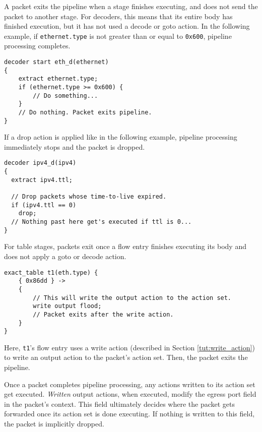 A packet exits the pipeline when
a stage finishes executing, and does not send the packet to another stage. For
decoders, this means that its entire body has finished execution, but it has not
used a decode or goto action. In the following example, if
\texttt{ethernet.type} is not greater than or equal to \texttt{0x600}, pipeline
processing completes.

\begin{codepage}
\begin{lstlisting}
decoder start eth_d(ethernet)
{
	extract ethernet.type;
	if (ethernet.type >= 0x600) {
		// Do something...
	}
	// Do nothing. Packet exits pipeline.
}
\end{lstlisting}
\end{codepage}

If a drop action is applied like in the following example, pipeline processing
immediately stops and the packet is dropped.

\begin{codepage}
\begin{lstlisting}
decoder ipv4_d(ipv4)
{
  extract ipv4.ttl;

  // Drop packets whose time-to-live expired.
  if (ipv4.ttl == 0)
  	drop;
  // Nothing past here get's executed if ttl is 0...
}
\end{lstlisting}
\end{codepage}

For table stages, packets exit once a flow entry finishes executing its body and
does not apply a goto or decode action.

\begin{codepage}
\begin{lstlisting}
exact_table t1(eth.type) {
	{ 0x86dd } ->
	{
		// This will write the output action to the action set.
		write output flood;
		// Packet exits after the write action.
	}
}
\end{lstlisting}
\end{codepage}

Here, \texttt{t1}'s flow entry uses a write action (described in Section
\ref{tut:write_action}) to write an output action to the packet's action set.
Then, the packet exits the pipeline.

Once a packet completes pipeline processing, any actions written to its action
set get executed. \textit{Written} output actions, when executed, modify the
egress port field in the packet's context. This field ultimately decides where
the packet gets forwarded once its action set is done executing. If nothing is
written to this field, the packet is implicitly dropped.

